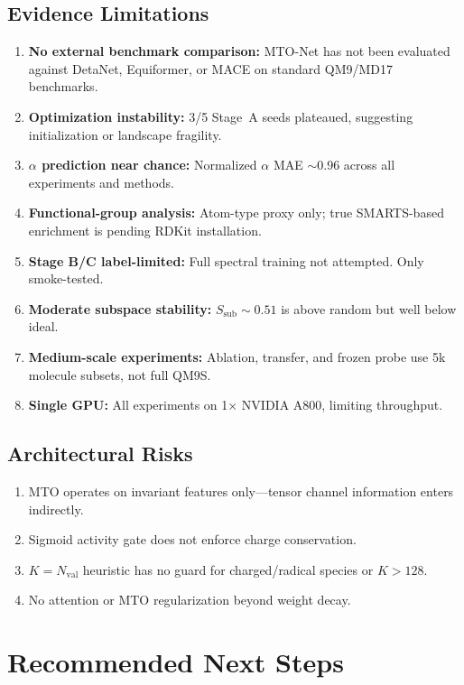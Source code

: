 \documentclass[11pt,a4paper]{article}
\begin{document}
\subsection{Evidence Limitations}
\begin{enumerate}[nosep]
    \item \textbf{No external benchmark comparison:} MTO-Net has not been evaluated against DetaNet, Equiformer, or MACE on standard QM9/MD17 benchmarks.
    \item \textbf{Optimization instability:} 3/5 Stage~A seeds plateaued, suggesting initialization or landscape fragility.
    \item \textbf{$\alpha$ prediction near chance:} Normalized $\alpha$ MAE $\sim$0.96 across all experiments and methods.
    \item \textbf{Functional-group analysis:} Atom-type proxy only; true SMARTS-based enrichment is pending RDKit installation.
    \item \textbf{Stage B/C label-limited:} Full spectral training not attempted. Only smoke-tested.
    \item \textbf{Moderate subspace stability:} $S_\text{sub} \sim 0.51$ is above random but well below ideal.
    \item \textbf{Medium-scale experiments:} Ablation, transfer, and frozen probe use 5k molecule subsets, not full QM9S.
    \item \textbf{Single GPU:} All experiments on 1$\times$ NVIDIA A800, limiting throughput.
\end{enumerate}

\subsection{Architectural Risks}
\begin{enumerate}[nosep]
    \item MTO operates on invariant features only---tensor channel information enters indirectly.
    \item Sigmoid activity gate does not enforce charge conservation.
    \item $K = N_\text{val}$ heuristic has no guard for charged/radical species or $K > 128$.
    \item No attention or MTO regularization beyond weight decay.
\end{enumerate}

\section{Recommended Next Steps}
\end{document}

